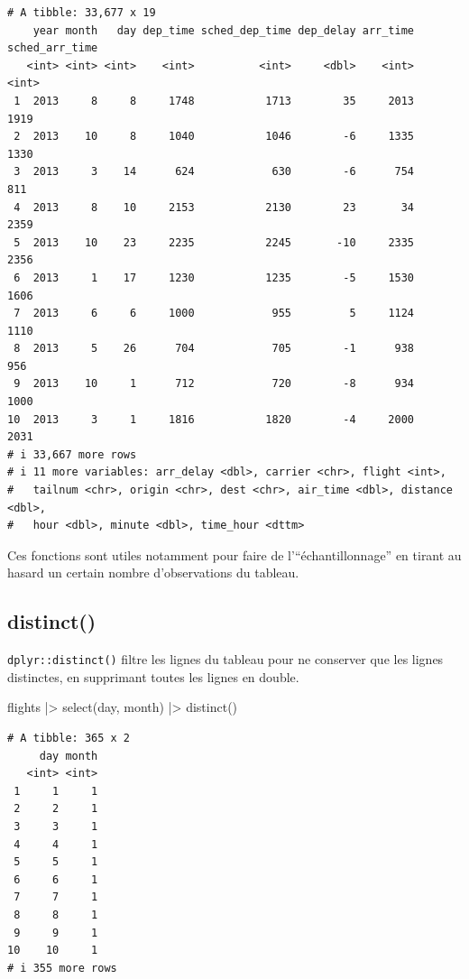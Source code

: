 \documentclass[
  letterpaper,
  DIV=11,
  numbers=noendperiod,
  oneside]{scrreprt}
\newenvironment{Shaded}{\begin{snugshade}}{\end{snugshade}}
\newcommand{\FunctionTok}[1]{\textcolor[rgb]{0.28,0.35,0.67}{#1}}
\newcommand{\NormalTok}[1]{\textcolor[rgb]{0.00,0.23,0.31}{#1}}
\newcommand{\SpecialCharTok}[1]{\textcolor[rgb]{0.37,0.37,0.37}{#1}}
\begin{document}
\begin{verbatim}
# A tibble: 33,677 x 19
    year month   day dep_time sched_dep_time dep_delay arr_time sched_arr_time
   <int> <int> <int>    <int>          <int>     <dbl>    <int>          <int>
 1  2013     8     8     1748           1713        35     2013           1919
 2  2013    10     8     1040           1046        -6     1335           1330
 3  2013     3    14      624            630        -6      754            811
 4  2013     8    10     2153           2130        23       34           2359
 5  2013    10    23     2235           2245       -10     2335           2356
 6  2013     1    17     1230           1235        -5     1530           1606
 7  2013     6     6     1000            955         5     1124           1110
 8  2013     5    26      704            705        -1      938            956
 9  2013    10     1      712            720        -8      934           1000
10  2013     3     1     1816           1820        -4     2000           2031
# i 33,667 more rows
# i 11 more variables: arr_delay <dbl>, carrier <chr>, flight <int>,
#   tailnum <chr>, origin <chr>, dest <chr>, air_time <dbl>, distance <dbl>,
#   hour <dbl>, minute <dbl>, time_hour <dttm>
\end{verbatim}

Ces fonctions sont utiles notamment pour faire de l'``échantillonnage''
en tirant au hasard un certain nombre d'observations du tableau.

\hypertarget{distinct}{%
\subsection{distinct()}\label{distinct}}

\texttt{dplyr::distinct()} filtre les lignes du tableau pour ne
conserver que les lignes distinctes, en supprimant toutes les lignes en
double.

\begin{Shaded}
\begin{Highlighting}[]
\NormalTok{flights }\SpecialCharTok{|\textgreater{}}
  \FunctionTok{select}\NormalTok{(day, month) }\SpecialCharTok{|\textgreater{}}
  \FunctionTok{distinct}\NormalTok{()}
\end{Highlighting}
\end{Shaded}

\begin{verbatim}
# A tibble: 365 x 2
     day month
   <int> <int>
 1     1     1
 2     2     1
 3     3     1
 4     4     1
 5     5     1
 6     6     1
 7     7     1
 8     8     1
 9     9     1
10    10     1
# i 355 more rows
\end{verbatim}
\end{document}

